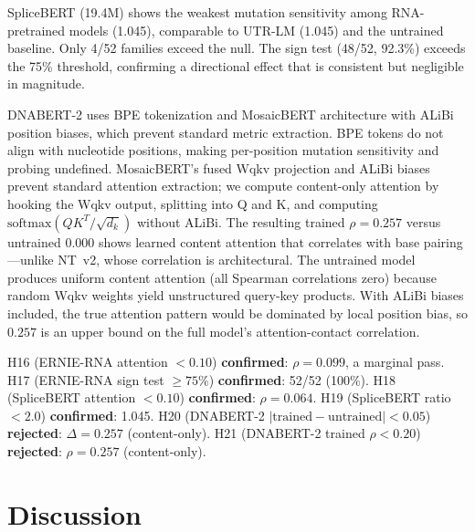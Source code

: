 \documentclass[11pt]{article}
\begin{document}
SpliceBERT (19.4M) shows the weakest mutation sensitivity among
RNA-pretrained models (1.045), comparable to UTR-LM (1.045) and the
untrained baseline.  Only 4/52 families exceed the null.  The sign
test (48/52, 92.3\%) exceeds the 75\% threshold, confirming a
directional effect that is consistent but negligible in magnitude.

DNABERT-2 uses BPE tokenization and MosaicBERT architecture with
ALiBi position biases, which prevent standard metric extraction.  BPE
tokens do not align with nucleotide positions, making per-position
mutation sensitivity and probing undefined.  MosaicBERT's fused Wqkv
projection and ALiBi biases prevent standard attention extraction;
we compute content-only attention by hooking the Wqkv output,
splitting into Q and K, and computing $\mathrm{softmax}(QK^T / \sqrt{d_k})$
without ALiBi.  The resulting trained $\rho = 0.257$ versus untrained
$0.000$ shows learned content attention that correlates with base
pairing---unlike NT~v2, whose correlation is architectural.  The
untrained model produces uniform content attention (all Spearman
correlations zero) because random Wqkv weights yield unstructured
query-key products.  With ALiBi biases included, the true attention
pattern would be dominated by local position bias, so $0.257$ is an
upper bound on the full model's attention-contact correlation.

H16 (ERNIE-RNA attention $< 0.10$) \textbf{confirmed}: $\rho =
0.099$, a marginal pass.  H17 (ERNIE-RNA sign test $\geq 75\%$)
\textbf{confirmed}: 52/52 (100\%).  H18 (SpliceBERT attention $<
0.10$) \textbf{confirmed}: $\rho = 0.064$.  H19 (SpliceBERT ratio
$< 2.0$) \textbf{confirmed}: 1.045.  H20 (DNABERT-2
$|\text{trained} - \text{untrained}| < 0.05$) \textbf{rejected}:
$\Delta = 0.257$ (content-only).  H21 (DNABERT-2 trained $\rho <
0.20$) \textbf{rejected}: $\rho = 0.257$ (content-only).


\section{Discussion}
\label{sec:discussion}
\end{document}
